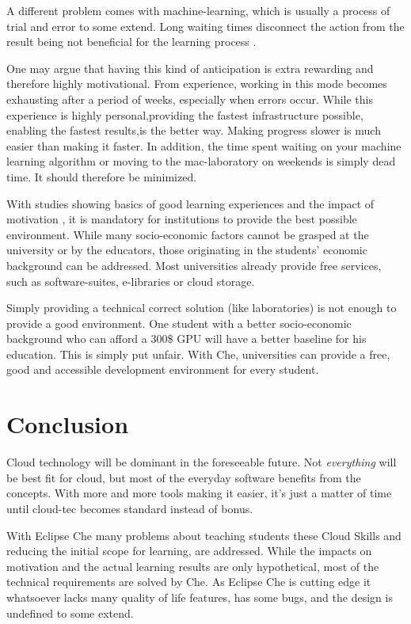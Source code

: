\documentclass[utf8]{lni}
\begin{document}
A different problem comes with machine-learning, which is usually a process of trial and error to some extend.
Long waiting times disconnect the action from the result being not beneficial for the learning process \cite{HU95}\cite{DECI93}. 

One may argue that having this kind of anticipation is extra rewarding and therefore highly motivational.
From experience, working in this mode becomes exhausting after a period of weeks, especially when errors occur.
While this experience is highly personal,providing the 
fastest infrastructure possible, enabling the fastest results,is the better way.
Making  progress  slower  is much easier than making it faster. 
In addition, the time spent waiting on your machine learning algorithm or moving to the mac-laboratory on weekends is simply dead time. 
It should therefore be minimized.   

With studies showing basics of good learning experiences \cite{FI05}\cite{TC88} and the impact of motivation \cite{HU95}\cite{DECI93}, it is mandatory for institutions to provide the best possible environment. 
While many socio-economic factors cannot be grasped at the university or by the educators, those originating in the students' economic background can be addressed.
Most universities already provide free services, such as software-suites, e-libraries or cloud storage.

Simply providing a technical correct solution (like laboratories) is not enough to provide a good environment.
One student with a better socio-economic background who can afford a 300\$ GPU will have a better baseline for his education. 
This is simply put unfair.
With Che, universities can provide a free, good and accessible development environment for every student.
\section{Conclusion}
\label{sec:Conclusion}
Cloud technology will be dominant in the foreseeable future. 
Not \textit{everything} will be best fit for cloud, but most of the everyday software benefits from the concepts. 
With more and more tools making it easier, it's just a matter of time until cloud-tec becomes standard instead of bonus.

With Eclipse Che many problems about teaching students these Cloud Skills and reducing the initial scope for learning, are addressed. 
While the impacts on motivation and the actual learning results are only hypothetical, most of the technical requirements are solved by Che.  
As Eclipse Che is cutting edge it whatsoever lacks many quality of life features, has some bugs, and the design is undefined to some extend. 
\end{document}

